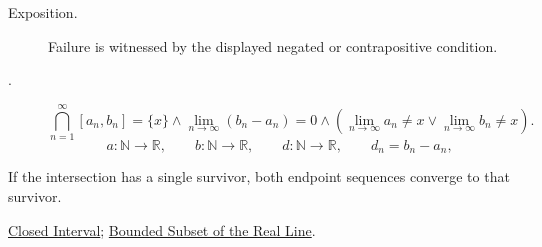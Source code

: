 \begin{remark*}
\begin{description}
  \item[Exposition.]
  Failure is witnessed by the displayed negated or contrapositive condition.

  \item[.]
  \[
\bigcap_{n=1}^{\infty}[a_n,b_n]=\{x\}
\land
\lim_{n\longrightarrow\infty}(b_n-a_n)=0
\land
\left(\lim_{n\longrightarrow\infty}a_n\ne x\lor \lim_{n\longrightarrow\infty}b_n\ne x\right).
\]
\[
a\colon\mathbb{N}\longrightarrow\mathbb{R},\qquad b\colon\mathbb{N}\longrightarrow\mathbb{R},\qquad d\colon\mathbb{N}\longrightarrow\mathbb{R},\qquad d_n=b_n-a_n,
\]
\end{description}
\end{remark*}

\begin{remark*}[Interpretation]
If the intersection has a single survivor, both endpoint sequences converge
to that survivor.
\end{remark*}

\begin{dependencies}
\hyperref[def:closed-interval]{Closed Interval};
\hyperref[def:bounded-subset-of-r]{Bounded Subset of the Real Line}.
\end{dependencies}



